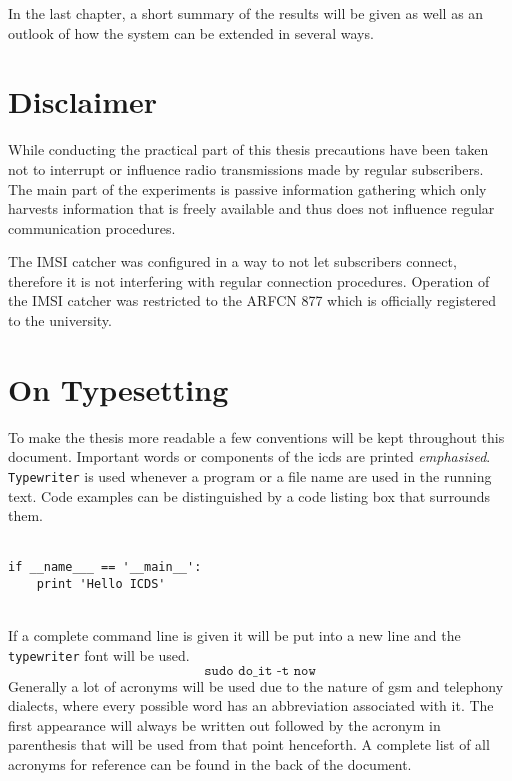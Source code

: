 In the last chapter, a short summary of the results will be given as well as an outlook of how the system can be extended in several ways.

\section{Disclaimer}
While conducting the practical part of this thesis precautions have been taken not to interrupt or influence radio transmissions made by regular subscribers.
The main part of the experiments is passive information gathering which only harvests information that is freely available and thus does not influence regular communication procedures.

The IMSI catcher was configured in a way to not let subscribers connect, therefore it is not interfering with regular connection procedures.
Operation of the IMSI catcher was restricted to the ARFCN 877 which is officially registered to the university.

\section{On Typesetting}
To make the thesis more readable a few conventions will be kept throughout this document.
Important words or components of the \gls{icds} are printed \emph{emphasised}.
\texttt{Type\-writer} is used whenever a program or a file name are used in the running text.
Code examples can be distinguished by a code listing box that surrounds them.\\\\
\hspace*{\dimexpr\fboxsep+\fboxrule}%
\begin{minipage}{\dimexpr\textwidth-4\fboxsep-2\fboxrule} 
\begin{lstlisting} 
if __name___ == '__main__':
    print 'Hello ICDS'
\end{lstlisting} 
\end{minipage}\\
If a complete command line is given it will be put into a new line and the \texttt{typewriter} font will be used.
\[\texttt{sudo do\_it -t now}\]
Generally a lot of acronyms will be used due to the nature of \gls{gsm} and telephony dialects, where every possible word has an abbreviation associated with it.
The first appearance will always be written out followed by the acronym in parenthesis that will be used from that point henceforth.
A complete list of all acronyms for reference can be found in the back of the document.